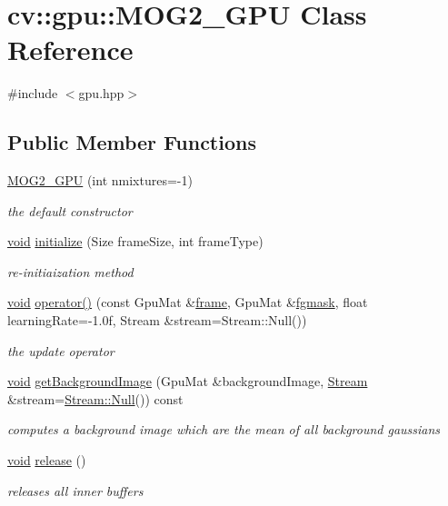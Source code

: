 \hypertarget{classcv_1_1gpu_1_1MOG2__GPU}{\section{cv\-:\-:gpu\-:\-:M\-O\-G2\-\_\-\-G\-P\-U Class Reference}
\label{classcv_1_1gpu_1_1MOG2__GPU}
}


{\ttfamily \#include $<$gpu.\-hpp$>$}

\subsection*{Public Member Functions}
\begin{DoxyCompactItemize}
\item 
\hyperlink{classcv_1_1gpu_1_1MOG2__GPU_a48d81f0eca6cae9357c588cfbdca98a0}{M\-O\-G2\-\_\-\-G\-P\-U} (int nmixtures=-\/1)
\begin{DoxyCompactList}\small\item\em the default constructor \end{DoxyCompactList}\item 
\hyperlink{legacy_8hpp_a8bb47f092d473522721002c86c13b94e}{void} \hyperlink{classcv_1_1gpu_1_1MOG2__GPU_a88346adae81c978b8f73155d9976bab4}{initialize} (Size frame\-Size, int frame\-Type)
\begin{DoxyCompactList}\small\item\em re-\/initiaization method \end{DoxyCompactList}\item 
\hyperlink{legacy_8hpp_a8bb47f092d473522721002c86c13b94e}{void} \hyperlink{classcv_1_1gpu_1_1MOG2__GPU_a52af0b1759b5918d5a25d7bac5f74954}{operator()} (const Gpu\-Mat \&\hyperlink{core__c_8h_a0430deaafd9043e478f306e33961299d}{frame}, Gpu\-Mat \&\hyperlink{legacy_8hpp_a7ff9edf5eaa300d3c1cea7de20631fd8}{fgmask}, float learning\-Rate=-\/1.\-0f, Stream \&stream=\-Stream\-::\-Null())
\begin{DoxyCompactList}\small\item\em the update operator \end{DoxyCompactList}\item 
\hyperlink{legacy_8hpp_a8bb47f092d473522721002c86c13b94e}{void} \hyperlink{classcv_1_1gpu_1_1MOG2__GPU_a75c4ea0642c30771c0cde08c8ec56e97}{get\-Background\-Image} (Gpu\-Mat \&background\-Image, \hyperlink{classcv_1_1gpu_1_1Stream}{Stream} \&stream=\hyperlink{classcv_1_1gpu_1_1Stream_af96c23564834f88333dcb8997df553f1}{Stream\-::\-Null}()) const 
\begin{DoxyCompactList}\small\item\em computes a background image which are the mean of all background gaussians \end{DoxyCompactList}\item 
\hyperlink{legacy_8hpp_a8bb47f092d473522721002c86c13b94e}{void} \hyperlink{classcv_1_1gpu_1_1MOG2__GPU_aa94e1815c0bbc13320ed311af29e8f49}{release} ()
\begin{DoxyCompactList}\small\item\em releases all inner buffers \end{DoxyCompactList}\end{DoxyCompactItemize}
